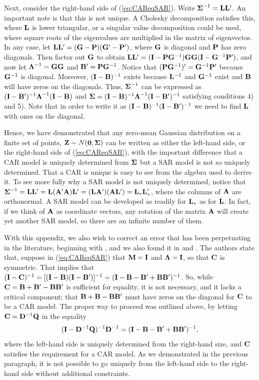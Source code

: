 \documentclass[11pt, titlepage]{article}\usepackage[]{graphicx}\usepackage[]{color}
\begin{document}
Next, consider the right-hand side of (\ref{eq:CAReqSAR}). Write $\mbox{\boldmath $\Sigma$}^{-1} = \mathbf{L}\mathbf{L}^{\prime}$. An important note is that this is not unique.  A Cholesky decomposition satisfies this, where $\mathbf{L}$ is lower triangular, or a singular value decomposition could be used, where square roots of the eigenvalues are multiplied in the matrix of eigenvectos. In any case, let  $\mathbf{L}\mathbf{L}^{\prime} = (\mathbf{G} - \mathbf{P})(\mathbf{G}^{\prime} - \mathbf{P}^{\prime})$, where $\mathbf{G}$ is diagonal and $\mathbf{P}$ has zero diagonals. Then factor out $\mathbf{G}$ to obtain $\mathbf{L}\mathbf{L}^{\prime} = (\mathbf{I} - \mathbf{P}\mathbf{G}^{-1})\mathbf{G}\mathbf{G}(\mathbf{I} - \mathbf{G}^{-1}\mathbf{P}^{\prime})$, and now let $\mbox{\boldmath $\Lambda$}^{-1} = \mathbf{G}\mathbf{G}$ and $\mathbf{B}^{\prime} = \mathbf{P}\mathbf{G}^{-1}$.  Notice that $(\mathbf{P}\mathbf{G}^{-1})^{\prime} = \mathbf{G}^{-1}\mathbf{P}^{\prime}$ because $\mathbf{G}^{-1}$ is diagonal. Moreover, $(\mathbf{I} - \mathbf{B})^{-1}$ exists because $\mathbf{L}^{-1}$ and $\mathbf{G}^{-1}$ exist and $\mathbf{B}$ will have zeros on the diagonals. Thus, $\mbox{\boldmath $\Sigma$}^{-1}$ can be expressed as $(\mathbf{I} - \mathbf{B}^{\prime})^{-1}\mbox{\boldmath $\Lambda$}^{-1}(\mathbf{I} - \mathbf{B})$ and $\mbox{\boldmath $\Sigma$} = (\mathbf{I} - \mathbf{B})^{-1}\mbox{\boldmath $\Lambda$}^{-1}(\mathbf{I} - \mathbf{B}^{\prime})^{-1}$ satisfying conditions 4) and 5).  Note that in order to write it as $(\mathbf{I} - \mathbf{B})^{-1}(\mathbf{I} - \mathbf{B}^{\prime})^{-1}$ we need to find $\mathbf{L}$ with ones on the diagonal.

Hence, we have demonstrated that any zero-mean Gaussian distribution on a finite set of points, $\mathbf{Z} \sim N(\mathbf{0},\mbox{\boldmath $\Sigma$})$ can be written as either the left-hand side, or the right-hand side of (\ref{eq:CAReqSAR}), with the important difference that a CAR model is uniquely determined from $\mbox{\boldmath $\Sigma$}$ but a SAR model is not so uniquely determined.  That a CAR is unique is easy to see from the algebra used to derive it.  To see more fully why a SAR model is not uniquely determined, notice that $\mbox{\boldmath $\Sigma$}^{-1} = \mathbf{L}\mathbf{L}^{\prime} = \mathbf{L}(\mathbf{A}^{\prime}\mathbf{A})\mathbf{L}^{\prime} = (\mathbf{L}\mathbf{A}^{\prime})(\mathbf{A}\mathbf{L}^{\prime}) = \mathbf{L}_*\mathbf{L}_*^{\prime}$, where the columns of $\mathbf{A}$ are orthonormal.  A SAR model can be developed as readily for $ \mathbf{L}_*$ as for $\mathbf{L}$.  In fact, if we think of $\mathbf{A}$ as coordinate vectors, any rotation of the matrix $\mathbf{A}$ will create yet another SAR model, so there are an infinite number of them.

With this appendix, we also wish to correct an error that has been perpetuating in the literature, beginning with \citet[p. 89]{Hain:spat:1990}, and we also found it in \citet{Scha:Gotw:stat:2005} and \citet{Dorm:etal:meth:2007}. The authors state that, suppose in (\ref{eq:CAReqSAR}) that $\mathbf{M} = \mathbf{I}$ and $\mbox{\boldmath $\Lambda$} = \mathbf{I}$, so that $\mathbf{C}$ is symmetric.  That implies that $(\mathbf{I}-\mathbf{C})^{-1} = [(\mathbf{I} - \mathbf{B})(\mathbf{I} - \mathbf{B}^{\prime})]^{-1} =(\mathbf{I} - \mathbf{B} - \mathbf{B}^{\prime} + \mathbf{B}\mathbf{B}^{\prime})^{-1}$. So, while $\mathbf{C} = \mathbf{B} + \mathbf{B}^{\prime} - \mathbf{B}\mathbf{B}^{\prime}$ is sufficient for equality, it is not necessary, and it lacks a critical component; that $\mathbf{B} + \mathbf{B} - \mathbf{B}\mathbf{B}^{\prime}$ must have zeros on the diagonal for $\mathbf{C}$ to be a CAR model. The proper way to proceed was outlined above, by letting $\mathbf{C} = \mathbf{D}^{-1}\mathbf{Q}$ in the equality 
\[
(\mathbf{I} - \mathbf{D}^{-1}\mathbf{Q})^{-1}\mathbf{D}^{-1} = (\mathbf{I} - \mathbf{B} - \mathbf{B}^{\prime} + \mathbf{B}\mathbf{B}^{\prime})^{-1},
\]
where the left-hand side is uniquely determined from the right-hand size, and $\mathbf{C}$ satisfies the requirement for a CAR model.  As we demonstrated in the previous paragraph, it is not possible to go uniquely from the left-hand side to the right-hand side without additional constraints.
\end{document}
